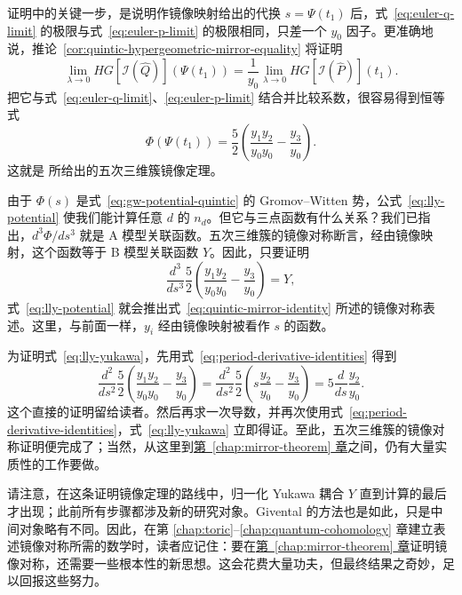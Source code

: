 证明中的关键一步，是说明作镜像映射给出的代换 $s=\Psi(t_1)$ 后，式~\eqref{eq:euler-q-limit} 的极限与式~\eqref{eq:euler-p-limit} 的极限相同，只差一个 $y_0$ 因子。更准确地说，推论~\ref{cor:quintic-hypergeometric-mirror-equality} 将证明
\[
\lim_{\lambda\to0}HG[\mathcal I(\widehat Q)](\Psi(t_1))
=\frac1{y_0}\lim_{\lambda\to0}HG[\mathcal I(\widehat P)](t_1).
\]
把它与式~\eqref{eq:euler-q-limit}、\eqref{eq:euler-p-limit} 结合并比较系数，很容易得到恒等式
\begin{equation}\label{eq:lly-potential}
\Phi(\Psi(t_1))=\frac52\left(\frac{y_1y_2}{y_0y_0}-\frac{y_3}{y_0}\right).
\end{equation}
这就是  所给出的五次三维簇镜像定理。

由于 $\Phi(s)$ 是式~\eqref{eq:gw-potential-quintic} 的 Gromov--Witten 势，公式~\eqref{eq:lly-potential} 使我们能计算任意 $d$ 的 $n_d$。但它与三点函数有什么关系？我们已指出，$d^3\Phi/ds^3$ 就是 A 模型关联函数。五次三维簇的镜像对称断言，经由镜像映射，这个函数等于
B 模型关联函数 $Y$。因此，只要证明
\begin{equation}\label{eq:lly-yukawa}
\frac{d^3}{ds^3}\frac52\left(\frac{y_1y_2}{y_0y_0}-\frac{y_3}{y_0}\right)=Y,
\end{equation}
式~\eqref{eq:lly-potential} 就会推出式~\eqref{eq:quintic-mirror-identity} 所述的镜像对称表述。这里，与前面一样，$y_i$ 经由镜像映射被看作 $s$ 的函数。

为证明式~\eqref{eq:lly-yukawa}，先用式~\eqref{eq:period-derivative-identities} 得到
\[
\frac{d^2}{ds^2}\frac52\left(\frac{y_1y_2}{y_0y_0}-\frac{y_3}{y_0}\right)
=\frac{d^2}{ds^2}\frac52\left(s\frac{y_2}{y_0}-\frac{y_3}{y_0}\right)
=5\frac d{ds}\frac{y_2}{y_0}.
\]
这个直接的证明留给读者。然后再求一次导数，并再次使用式~\eqref{eq:period-derivative-identities}，式~\eqref{eq:lly-yukawa} 立即得证。至此，五次三维簇的镜像对称证明便完成了；当然，从这里到\hyperref[chap:mirror-theorem]{第~\ref*{chap:mirror-theorem} 章}之间，仍有大量实质性的工作要做。

请注意，在这条证明镜像定理的路线中，归一化 Yukawa 耦合 $Y$ 直到计算的最后才出现；此前所有步骤都涉及新的研究对象。Givental 的方法也是如此，只是中间对象略有不同。因此，在第 \hyperref[chap:toric]{\ref*{chap:toric}}--\hyperref[chap:quantum-cohomology]{\ref*{chap:quantum-cohomology}} 章建立表述镜像对称所需的数学时，读者应记住：要在\hyperref[chap:mirror-theorem]{第~\ref*{chap:mirror-theorem} 章}证明镜像对称，还需要一些根本性的新思想。这会花费大量功夫，但最终结果之奇妙，足以回报这些努力。

\par\endgroup
